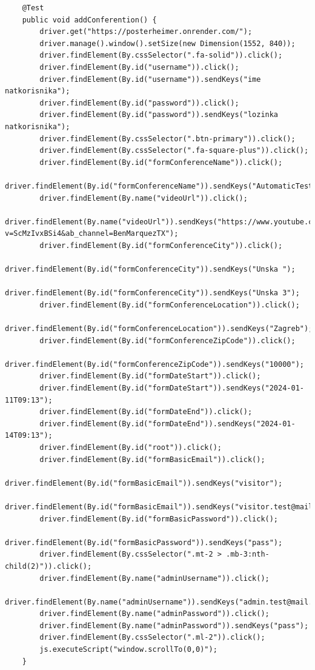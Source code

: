 \begin{lstlisting}
	@Test
	public void addConferention() {
		driver.get("https://posterheimer.onrender.com/");
		driver.manage().window().setSize(new Dimension(1552, 840));
		driver.findElement(By.cssSelector(".fa-solid")).click();
		driver.findElement(By.id("username")).click();
		driver.findElement(By.id("username")).sendKeys("ime natkorisnika");
		driver.findElement(By.id("password")).click();
		driver.findElement(By.id("password")).sendKeys("lozinka natkorisnika");
		driver.findElement(By.cssSelector(".btn-primary")).click();
		driver.findElement(By.cssSelector(".fa-square-plus")).click();
		driver.findElement(By.id("formConferenceName")).click();
		driver.findElement(By.id("formConferenceName")).sendKeys("AutomaticTestKonferencija");
		driver.findElement(By.name("videoUrl")).click();
		driver.findElement(By.name("videoUrl")).sendKeys("https://www.youtube.com/watch?v=ScMzIvxBSi4&ab_channel=BenMarquezTX");
		driver.findElement(By.id("formConferenceCity")).click();
		driver.findElement(By.id("formConferenceCity")).sendKeys("Unska ");
		driver.findElement(By.id("formConferenceCity")).sendKeys("Unska 3");
		driver.findElement(By.id("formConferenceLocation")).click();
		driver.findElement(By.id("formConferenceLocation")).sendKeys("Zagreb");
		driver.findElement(By.id("formConferenceZipCode")).click();
		driver.findElement(By.id("formConferenceZipCode")).sendKeys("10000");
		driver.findElement(By.id("formDateStart")).click();
		driver.findElement(By.id("formDateStart")).sendKeys("2024-01-11T09:13");
		driver.findElement(By.id("formDateEnd")).click();
		driver.findElement(By.id("formDateEnd")).sendKeys("2024-01-14T09:13");
		driver.findElement(By.id("root")).click();
		driver.findElement(By.id("formBasicEmail")).click();
		driver.findElement(By.id("formBasicEmail")).sendKeys("visitor");
		driver.findElement(By.id("formBasicEmail")).sendKeys("visitor.test@mail.hr");
		driver.findElement(By.id("formBasicPassword")).click();
		driver.findElement(By.id("formBasicPassword")).sendKeys("pass");
		driver.findElement(By.cssSelector(".mt-2 > .mb-3:nth-child(2)")).click();
		driver.findElement(By.name("adminUsername")).click();
		driver.findElement(By.name("adminUsername")).sendKeys("admin.test@mail.hr");
		driver.findElement(By.name("adminPassword")).click();
		driver.findElement(By.name("adminPassword")).sendKeys("pass");
		driver.findElement(By.cssSelector(".ml-2")).click();
		js.executeScript("window.scrollTo(0,0)");
	}
\end{lstlisting}
		 	

